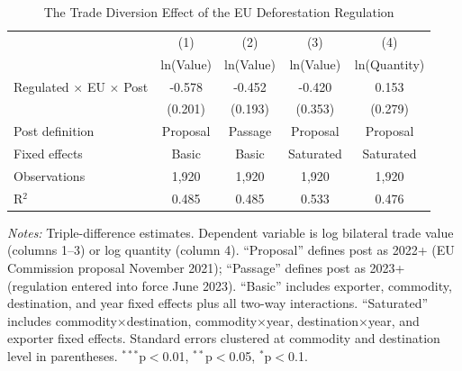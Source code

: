 \begin{table}[htbp]
\centering
\caption{The Trade Diversion Effect of the EU Deforestation Regulation}
\label{tab:main}
\small
\begin{tabular}{lcccc}
\hline\hline
 & (1) & (2) & (3) & (4) \\
 & ln(Value) & ln(Value) & ln(Value) & ln(Quantity) \\
\hline
Regulated $\times$ EU $\times$ Post & -0.578 & -0.452 & -0.420 & 0.153 \\
 & (0.201) & (0.193) & (0.353) & (0.279) \\
\hline
Post definition & Proposal & Passage & Proposal & Proposal \\
Fixed effects & Basic & Basic & Saturated & Saturated \\
Observations & 1,920 & 1,920 & 1,920 & 1,920 \\
R$^2$ & 0.485 & 0.485 & 0.533 & 0.476 \\
\hline\hline
\end{tabular}
\begin{minipage}{0.95\textwidth}
\vspace{0.3em}\footnotesize
\textit{Notes:} Triple-difference estimates. Dependent variable is log bilateral trade value (columns 1--3) or log quantity (column 4). ``Proposal'' defines post as 2022+ (EU Commission proposal November 2021); ``Passage'' defines post as 2023+ (regulation entered into force June 2023). ``Basic'' includes exporter, commodity, destination, and year fixed effects plus all two-way interactions. ``Saturated'' includes commodity$\times$destination, commodity$\times$year, destination$\times$year, and exporter fixed effects. Standard errors clustered at commodity and destination level in parentheses. $^{***}$p$<$0.01, $^{**}$p$<$0.05, $^{*}$p$<$0.1.
\end{minipage}
\end{table}
